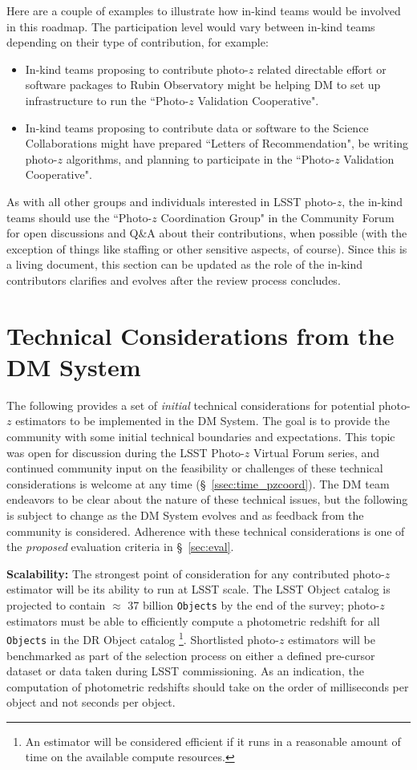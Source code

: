 \documentclass[DM,authoryear,toc]{lsstdoc}
\begin{document}
Here are a couple of examples to illustrate how in-kind teams would be involved in this roadmap.
The participation level would vary between in-kind teams depending on their type of contribution, for example:
\begin{itemize}
\item In-kind teams proposing to contribute photo-$z$ related directable effort or software packages to Rubin Observatory might be helping DM to set up infrastructure to run the ``Photo-$z$ Validation Cooperative".
\item In-kind teams proposing to contribute data or software to the Science Collaborations might have prepared ``Letters of Recommendation", be writing photo-$z$ algorithms, and planning to participate in the ``Photo-$z$ Validation Cooperative".
\end{itemize}

As with all other groups and individuals interested in LSST photo-$z$, the in-kind teams should use the ``Photo-$z$ Coordination Group" in the Community Forum for open discussions and Q\&A about their contributions, when possible (with the exception of things like staffing or other sensitive aspects, of course).
Since this is a living document, this section can be updated as the role of the in-kind contributors clarifies and evolves after the review process concludes.


\section{Technical Considerations from the DM System}\label{sec:dmcon}

The following provides a set of {\it initial} technical considerations for potential photo-$z$ estimators to be implemented in the DM System.
The goal is to provide the community with some initial technical boundaries and expectations. 
This topic was open for discussion during the LSST Photo-$z$ Virtual Forum series, and continued community input on the feasibility or challenges of these technical considerations is welcome at any time (\S~\ref{ssec:time_pzcoord}). 
The DM team endeavors to be clear about the nature of these technical issues, but the following is subject to change as the DM System evolves and as feedback from the community is considered. 
Adherence with these technical considerations is one of the {\it proposed} evaluation criteria in \S~\ref{sec:eval}.

\textbf{Scalability:}
The strongest point of consideration for any contributed  photo-$z$ estimator will be its ability to run at LSST scale. 
The LSST Object catalog is projected to contain $\approx$ 37 billion {\tt Objects} by the end of the survey;  photo-$z$ estimators must be able to efficiently compute a photometric redshift for all {\tt Objects} in the DR Object catalog \footnote{An estimator will be considered efficient if it runs in a reasonable amount of time on the available compute resources.}. 
Shortlisted photo-$z$ estimators will be benchmarked as part of the selection process on either a defined pre-cursor dataset or data taken during LSST commissioning.
As an indication, the computation of photometric redshifts should take on the order of milliseconds per object and not seconds per object.
\end{document}
